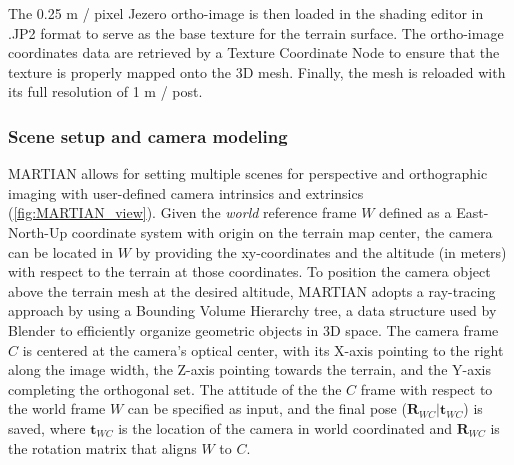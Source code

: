 The 0.25 m / pixel Jezero ortho-image is then loaded in the shading editor in .JP2 format to serve as the base texture for the terrain surface. The ortho-image coordinates data are retrieved by a Texture Coordinate Node to ensure that the texture is properly mapped onto the 3D mesh. Finally, the mesh is reloaded with its full resolution of 1 m / post.

\subsubsection{Scene setup and camera modeling}
\label{subsubsec:scene_setup}

MARTIAN allows for setting multiple scenes for perspective and orthographic imaging with user-defined camera intrinsics and extrinsics (\ref{fig:MARTIAN_view}). Given the \textit{world} reference frame $W$ defined as a East-North-Up coordinate system with origin on the terrain map center, the camera can be located in $W$ by providing the xy-coordinates and the altitude (in meters) with respect to the terrain at those coordinates. To position the camera object above the terrain mesh at the desired altitude, MARTIAN adopts a ray-tracing approach by using a Bounding Volume Hierarchy tree, a data structure used by Blender to efficiently organize geometric objects in 3D space. The camera frame $C$ is centered at the camera's optical center, with its X-axis pointing to the right along the image width, the Z-axis pointing towards the terrain, and the Y-axis completing the orthogonal set. The attitude of the the $C$ frame with respect to the world frame $W$ can be specified as input, and the final pose ($\mathbf{R}_{WC} \vert \mathbf{t}_{WC}$) is saved, where $\mathbf{t}_{WC}$ is the location of the camera in world coordinated and $\mathbf{R}_{WC}$ is the rotation matrix that aligns $W$ to $C$.

